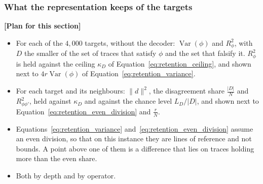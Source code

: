 \documentclass[titlepage,a4paper,11pt]{report}
\newenvironment{RSplan}{\par\medskip\color{orange!85!black}\noindent\textbf{[Plan for this section]}\par}{\par\medskip}
\begin{document}
    \subsubsection{What the representation keeps of the targets}
    \begin{RSplan}
    \begin{itemize}
        \item For each of the $4{,}000$ targets, without the decoder: $\operatorname{Var}(\phi)$ and $R^2_\phi$, with $D$ the smaller of the set of traces that satisfy $\phi$ and the set that falsify it. $R^2_\phi$ is held against the ceiling $\kappa_D$ of Equation~\eqref{eq:retention_ceiling}, and shown next to $4r\operatorname{Var}(\phi)$ of Equation~\eqref{eq:retention_variance}.
        \item For each target and its neighbours: $\lVert d\rVert^2$, the disagreement share $\frac{|D|}{N}$ and $R^2_{\phi\phi'}$, held against $\kappa_D$ and against the chance level $L_D/|D|$, and shown next to Equation~\eqref{eq:retention_even_division} and $\frac rN$.
        \item Equations~\eqref{eq:retention_variance} and~\eqref{eq:retention_even_division} assume an even division, so that on this instance they are lines of reference and not bounds. A point above one of them is a difference that lies on traces holding more than the even share.
        \item Both by depth and by operator.
    \end{itemize}
    \end{RSplan}
\end{document}
